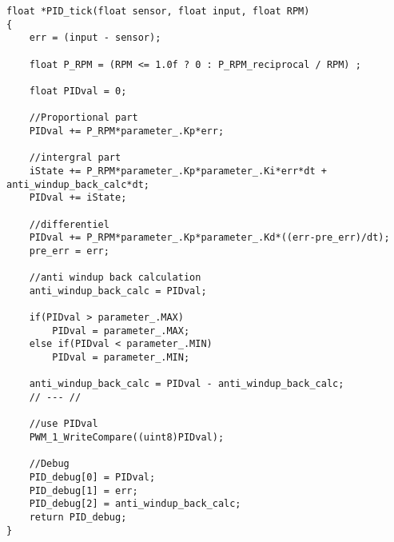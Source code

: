 \lstset{language=C}
\begin{lstlisting}
float *PID_tick(float sensor, float input, float RPM)
{
	err = (input - sensor);
	
	float P_RPM = (RPM <= 1.0f ? 0 : P_RPM_reciprocal / RPM) ;
	
	float PIDval = 0;
	
	//Proportional part
	PIDval += P_RPM*parameter_.Kp*err;
	
	//intergral part
	iState += P_RPM*parameter_.Kp*parameter_.Ki*err*dt + anti_windup_back_calc*dt;
	PIDval += iState; 
	
	//differentiel
	PIDval += P_RPM*parameter_.Kp*parameter_.Kd*((err-pre_err)/dt);
	pre_err = err;
	
	//anti windup back calculation
	anti_windup_back_calc = PIDval;
	
	if(PIDval > parameter_.MAX)
		PIDval = parameter_.MAX;
	else if(PIDval < parameter_.MIN)
		PIDval = parameter_.MIN;
	
	anti_windup_back_calc = PIDval - anti_windup_back_calc;
	// --- //
	
	//use PIDval
	PWM_1_WriteCompare((uint8)PIDval);
	
	//Debug
	PID_debug[0] = PIDval;
	PID_debug[1] = err;
	PID_debug[2] = anti_windup_back_calc;
	return PID_debug;
}
\end{lstlisting}


